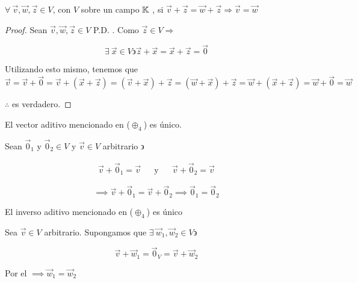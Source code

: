\begin{theorem} \label{teo1}
    $\forall \: \vec{v},\vec{w},\vec{z} \in V$, con $V$ sobre un campo $\mathbb{K}$ , si $\vec{v}+\vec{z} = \vec{w}+\vec{z} \Rightarrow \vec{v} = \vec{w}$
\end{theorem}

\begin{proof}
    Sean $\vec{v},\vec{w},\vec{z} \in V$ P.D. . Como $\vec{z} \in V \Rightarrow$

    \begin{equation*}
        \exists \: \vec{x} \in V \backepsilon \vec{z}+\vec{x}  = \vec{x}+\vec{z} = \vec{0}
    \end{equation*}

    Utilizando esto mismo, tenemos que
    \begin{equation*}
        \vec{v} = \vec{v} + \vec{0} = \vec{v} + (\vec{x}+\vec{z}) = (\vec{v}+\vec{x})+\vec{z} = (\vec{w}+\vec{x})+\vec{z} = \vec{w} + (\vec{x}+\vec{z}) = \vec{w} + \vec{0} = \vec{w}
    \end{equation*}

    $\therefore$  es verdadero.
\end{proof}

\begin{corollary}
El vector aditivo mencionado en (${\oplus}_{4}$) es único.
\end{corollary}

\begin{orangeproof}
    Sean ${\vec{0}}_{1}$ y ${\vec{0}}_{2} \in V$ y $\vec{v} \in V$ arbitrario $\backepsilon$

    \begin{align*}
    \vec{v}+{\vec{0}}_{1}= \vec{v}& & \text{y} & & \vec{v}+{\vec{0}}_{2}= \vec{v}
    \end{align*}

    \begin{equation*}
        \implies \vec{v}+{\vec{0}}_{1} = \vec{v}+{\vec{0}}_{2} \implies {\vec{0}}_{1} = {\vec{0}}_{2}
    \end{equation*}
\end{orangeproof}

\begin{corollary}
    El inverso aditivo mencionado en (${\oplus}_{4}$) es único
\end{corollary}

\begin{orangeproof}
    Sea $\vec{v} \in V$ arbitrario. Supongamos que $\exists \: {\vec{w}}_{1},{\vec{w}}_{2} \in V \backepsilon$

    \begin{equation*}
        \vec{v}+{\vec{w}}_{1} = {\vec{0}}_{V} = \vec{v}+{\vec{w}}_{2}
    \end{equation*}

    Por el  $ \implies {\vec{w}}_{1}={\vec{w}}_{2}$
\end{orangeproof}

